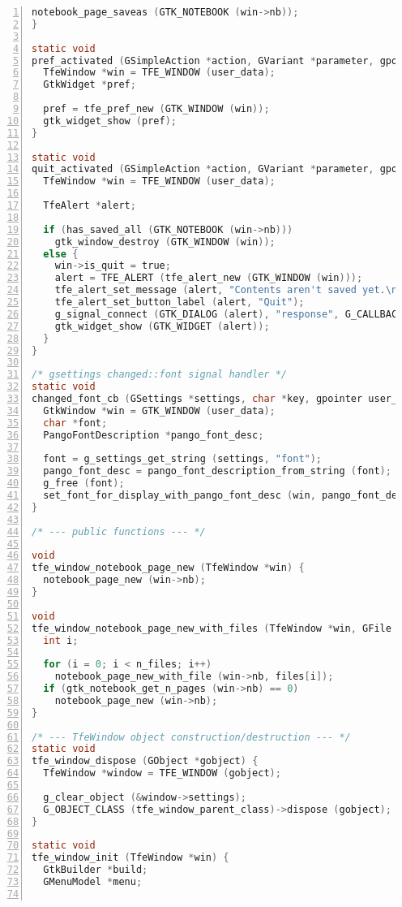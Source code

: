 \begin{lstlisting}[language=C, numbers=left]
  notebook_page_saveas (GTK_NOTEBOOK (win->nb));
}

static void
pref_activated (GSimpleAction *action, GVariant *parameter, gpointer user_data) {
  TfeWindow *win = TFE_WINDOW (user_data);
  GtkWidget *pref;

  pref = tfe_pref_new (GTK_WINDOW (win));
  gtk_widget_show (pref);
}

static void
quit_activated (GSimpleAction *action, GVariant *parameter, gpointer user_data) {
  TfeWindow *win = TFE_WINDOW (user_data);

  TfeAlert *alert;

  if (has_saved_all (GTK_NOTEBOOK (win->nb)))
    gtk_window_destroy (GTK_WINDOW (win));
  else {
    win->is_quit = true;
    alert = TFE_ALERT (tfe_alert_new (GTK_WINDOW (win)));
    tfe_alert_set_message (alert, "Contents aren't saved yet.\nAre you sure to quit?");
    tfe_alert_set_button_label (alert, "Quit");
    g_signal_connect (GTK_DIALOG (alert), "response", G_CALLBACK (alert_response_cb), win);
    gtk_widget_show (GTK_WIDGET (alert));
  }
}

/* gsettings changed::font signal handler */
static void
changed_font_cb (GSettings *settings, char *key, gpointer user_data) {
  GtkWindow *win = GTK_WINDOW (user_data); 
  char *font;
  PangoFontDescription *pango_font_desc;

  font = g_settings_get_string (settings, "font");
  pango_font_desc = pango_font_description_from_string (font);
  g_free (font);
  set_font_for_display_with_pango_font_desc (win, pango_font_desc);
}

/* --- public functions --- */

void
tfe_window_notebook_page_new (TfeWindow *win) {
  notebook_page_new (win->nb);
}

void
tfe_window_notebook_page_new_with_files (TfeWindow *win, GFile **files, int n_files) {
  int i;

  for (i = 0; i < n_files; i++)
    notebook_page_new_with_file (win->nb, files[i]);
  if (gtk_notebook_get_n_pages (win->nb) == 0)
    notebook_page_new (win->nb);
}

/* --- TfeWindow object construction/destruction --- */ 
static void
tfe_window_dispose (GObject *gobject) {
  TfeWindow *window = TFE_WINDOW (gobject);

  g_clear_object (&window->settings);
  G_OBJECT_CLASS (tfe_window_parent_class)->dispose (gobject);
}

static void
tfe_window_init (TfeWindow *win) {
  GtkBuilder *build;
  GMenuModel *menu;


\end{lstlisting}
